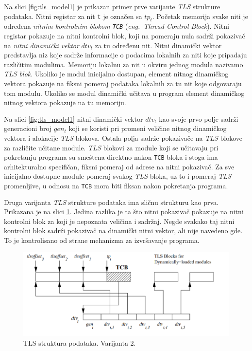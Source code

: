 \documentclass[12pt,oneside]{memoir}
\begin{document}
Na slici \ref{fig:tls_model1} je prikazan primer prve varijante \emph{TLS} strukture podataka. Nitni registar za nit \texttt{t} je označen sa \texttt{$tp_t$}. Početak memorija svake niti je određena \emph{nitnim kontrolnim blokom \texttt{TCB}} (\emph{eng.~Thread Control Block}). Nitni registar pokazuje na nitni kontrolni blok, koji na pomeraju nula sadrži pokazivač na \emph{nitni dinamički vektor} \texttt{$dtv_t$} za tu određenu nit. Nitni dinamički vektor predstavlja niz koje sadrže informacije o podacima lokalnih za niti koje pripadaju različitim modulima. Memoriju lokalnu za nit u okviru jednog modula nazivamo \emph{TLS blok}. Ukoliko je modul inicijalno dostupan, element nitnog dinamičkog vektora pokazuje na fiksni pomeraj podataka lokalnih za tu nit koje odgovaraju tom modulu. Ukoliko se modul dinamički učitava u program element dinamičkog nitnog vektora pokazuje na tu memoriju.

Na slici \ref{fig:tls_model1} nitni dinamički vektor \texttt{$dtv_t$} kao svoje prvo polje sadrži generacioni broj \texttt{$gen_t$} koji se koristi pri promeni veličine nitnog dinamičkog vektora i alokacije \emph{TLS} blokova. Ostala polja sadrže pokazivače na \emph{TLS} blokove za različite učitane module. \emph{TLS} blokovi za module koji se učitavaju pri pokretanju programa su smeštena direktno nakon \texttt{TCB} bloka i stoga ima arhitekturalno specifičan, fiksni pomeraj od adrese na nitni pokazivač. Za sve inicijalno dostupne module pomeraj svakog \emph{TLS} bloka, uz to i pomeraj \emph{TLS} promenljive, u odnosu na \texttt{TCB} mora biti fiksan nakon pokretanja programa.

Druga varijanta \emph{TLS} strukture podataka ima sličnu strukturu kao prva. Prikazana je na slici \ref{fig:tls_model2}. Jedina razlika je ta što nitni pokazivač pokazuje na nitni kontrolni blok za koji je nepoznata veličina i sadržaj. Negde svakako taj nitni kontrolni blok sadrži pokazivač na dinamički nitni vektor, ali nije navedeno gde. To je kontrolisano od strane mehanizma za izvršavanje programa.

\begin{figure}[h!]
	\begin{center}
		\includegraphics[scale=0.6]{slike/TLSmodelV2.png}
	\end{center}
	\caption{TLS struktura podataka. Varijanta 2.}
	\label{fig:tls_model2}
\end{figure}
\end{document}
